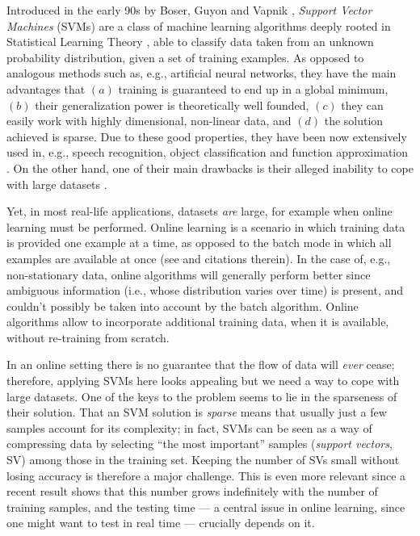 Introduced in the early 90s by Boser, Guyon and Vapnik \cite{BGV92},
\emph{Support Vector Machines} (SVMs) are a class of machine learning
algorithms deeply rooted in Statistical Learning Theory
\cite{v-edbed-82}, able to classify data taken from an unknown
probability distribution, given a set of training examples. As opposed
to analogous methods such as, e.g., artificial neural networks, they
have the main advantages that $(a)$ training is guaranteed to end up
in a global minimum, $(b)$ their generalization power is theoretically
well founded, $(c)$ they can easily work with highly dimensional,
non-linear data, and $(d)$ the solution achieved is sparse. Due to
these good properties, they have been now extensively used in, e.g.,
speech recognition, object classification and function approximation
\cite{Cristianini00}. On the other hand, one of their main drawbacks
is their alleged inability to cope with large datasets
\cite{KeerthiCDC06}.

Yet, in most real-life applications, datasets \emph{are} large, for
example when online learning must be performed. Online learning is a
scenario in which training data is provided one example at a time, as
opposed to the batch mode in which all examples are available at once
(see \cite{Laskov2006} and citations therein). In the case of, e.g.,
non-stationary data, online algorithms will generally perform better
since ambiguous information (i.e., whose distribution varies over
time) is present, and couldn't possibly be taken into account by the
batch algorithm. Online algorithms allow to incorporate additional
training data, when it is available, without re-training from scratch.

In an online setting there is no guarantee that the flow of data will
\emph{ever} cease; therefore, applying SVMs here looks appealing but
we need a way to cope with large datasets. One of the keys to the
problem seems to lie in the sparseness of their solution. That an SVM
solution is \emph{sparse} means that usually just a few samples
account for its complexity; in fact, SVMs can be seen as a way of
compressing data by selecting ``the most important'' samples
(\emph{support vectors}, SV) among those in the training set. Keeping
the number of SVs small without losing accuracy is therefore a major
challenge. This is even more relevant since a recent result
\cite{Steinwart03} shows that this number grows indefinitely with
the number of training samples, and the testing time --- a central
issue in online learning, since one might want to test in real time
--- crucially depends on it.

